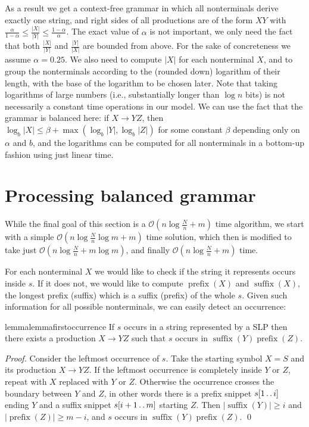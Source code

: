 \documentclass[runningheads]{llncs}
\DeclareMathOperator{\prefix}{prefix}
\DeclareMathOperator{\suffix}{suffix}
\newcommand{\twodots}{\mathinner{\ldotp\ldotp}}
\begin{document}
As a result we get a context-free grammar in which all nonterminals derive exactly one string, and right sides of all productions are of the form $XY$ with $\frac{\alpha}{1-\alpha}\leq\frac{|X|}{|Y|}\leq\frac{1-\alpha}{\alpha}$. The exact value of $\alpha$ is not important, we only need the fact that both $\frac{|X|}{|Y|}$ and $\frac{|Y|}{|X|}$ are bounded from above. For the sake of concreteness we assume $\alpha=0.25$. We also need to compute $|X|$ for each nonterminal $X$, and to group the nonterminals according to the (rounded down) logarithm of their length, with the base of the logarithm to be chosen later. Note that taking logarithms of large numbers (i.e., substantially longer than $\log n$ bits) is not necessarily a constant time operations in our model. 
We can use the fact that the grammar is balanced here: if $X\rightarrow YZ$, then $\log_b|X|\leq\beta+\max\left(\log_b|Y|,\log_b|Z|\right)$ for some constant $\beta$ depending only on $\alpha$ and $b$, and the logarithms can be computed for all nonterminals in a bottom-up fashion using just linear time.

\section{Processing balanced grammar}

While the final goal of this section is a $\mathcal{O}(n\log\frac{N}{n}+m)$ time algorithm, we start with a simple $\mathcal{O}(n\log\frac{N}{n}\log m+m)$ time solution, which then is modified to take just $\mathcal{O}(n\log\frac{N}{n}+m\log m)$, and finally $\mathcal{O}(n\log\frac{N}{n}+m)$ time.

For each nonterminal $X$ we would like to check if the string it represents occurs inside $s$. If it does not, we would like to compute $\prefix(X)$ and $\suffix(X)$, the longest prefix (suffix) which is a suffix (prefix) of the whole $s$. Given such information for all possible nonterminals, we can easily detect an occurrence:

\begin{restatable}{lemma}{lemmafirstoccurrence}
\label{lemma:first occurrence}
If $s$ occurs in a string represented by a SLP then there exists a production $X\rightarrow YZ$ such that $s$ occurs in $\suffix(Y)\prefix(Z)$.
\end{restatable}

\begin{proof}
Consider the leftmost occurrence of $s$. Take the starting symbol $X=S$ and its production $X\rightarrow YZ$. If the leftmost occurrence is completely inside $Y$ or $Z$, repeat with $X$ replaced with $Y$ or $Z$. Otherwise the occurrence crosses the boundary between $Y$ and $Z$, in other words there is a prefix snippet $s[1\twodots i]$ ending $Y$ and a suffix snippet $s[i+1\twodots m]$ starting $Z$. Then $\left|\suffix(Y)\right|\geq i$ and $\left|\prefix(Z)\right|\geq m-i$, and $s$ occurs in $\suffix(Y)\prefix(Z)$.
\qed
\end{proof}
\end{document}
